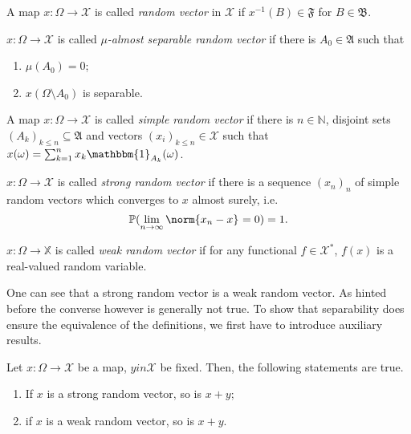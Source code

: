\begin{defn}
    A map \( x: \Omega \to \mathcal{X} \) is called \emph{random vector} in \( \mathcal{X} \) if \( x^{-1}(B) \in \mathfrak{F} \) for \( B \in \mathfrak{B} \).
\end{defn}


\begin{defn}
    \( x: \Omega  \to \mathcal{X}  \) is called \emph{\( \mu \)-almost separable random vector} if there is \( A_0 \in \mathfrak{A} \) such that 
  \begin{enumerate}[1)]
    \item \( \mu(A_0)=0 \);
    \item \( x(\Omega \setminus A_0) \) is separable.
  \end{enumerate}
\end{defn}


\begin{defn}
    A map \( x: \Omega  \to \mathcal{X} \) is called \emph{simple random vector} if there is \( n \in \mathbb{N} \), disjoint sets \( (A_k)_{k\leq n} \subseteq \mathfrak{A} \) and vectors \( (x_i)_{k \leq n} \in \mathcal{X} \) such that \( x(\omega) = \sum_{k=1}^{n} x_k\mathbbm{1}_{A_k}(\omega) \). 
\end{defn}


\begin{defn}
    \( x: \Omega  \to \mathcal{X} \) is called \emph{strong random vector} if there is a sequence \( (x_n)_n \) of simple random vectors which converges to \( x \) almost surely, i.e.
    \[ \mathbb{P}(\lim_{n \to \infty} \norm{x_n-x}_{}=0)=1. \]
\end{defn}


\begin{defn}
    \( x: \Omega \to \mathbb{X} \) is called \emph{weak random vector} if for any functional \( f\in \mathcal{X}^{*} \), \( f(x) \) is a real-valued random variable. 
\end{defn}

One can see that a strong random vector is a weak random vector. As hinted before the converse however is generally not true. To show that separability does ensure the equivalence of the definitions, we first have to introduce auxiliary results. 


\begin{lem}[]
    Let \( x: \Omega \to \mathcal{X} \) be a map, \( y in \mathcal{X} \) be fixed. Then, the following statements are true.
    \begin{enumerate}[1)]
      \item If \( x \) is a strong random vector, so is \( x+y \);
      \item if \( x \) is a weak random vector, so is \( x+y \).
    \end{enumerate}
\end{lem}

